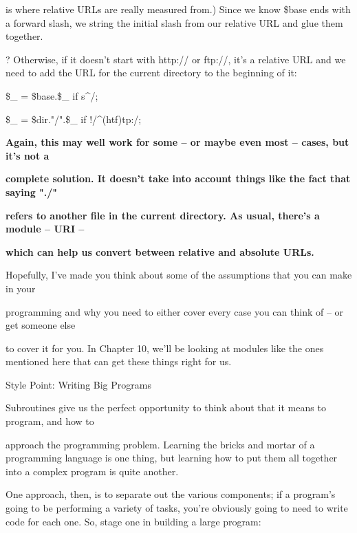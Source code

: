\documentclass[a4paper,11pt]{book}
\begin{document}
\noindent is where relative URLs are really measured from.) Since we know \$base ends with a forward slash, we string the initial slash from our relative URL and glue them together.

\noindent ? Otherwise, if it doesn't start with http:// or ftp://, it's a relative URL and we need to add the URL for the current directory to the beginning of it:

\noindent 

\noindent \$\_  = \$base.\$\_  if s\textbar \^{}/\textbar \textbar ;

\noindent \$\_  = \$dir."/".\$\_  if !/\^{}(ht\textbar f)tp:/;

\noindent 

\noindent 

\noindent \textbf{Again, this may well work for some -- or maybe even most -- cases, but it's not a}

\noindent \textbf{complete solution. It doesn't take into account things like the fact that saying "./"}

\noindent \textbf{refers to another file in the current directory. As usual, there's a module -- URI --}

\noindent \textbf{which can help us convert between relative and absolute URLs.}

\noindent 

\noindent 

\noindent Hopefully,  I've made you  think  about  some  of  the  assumptions  that  you  can  make  in  your

\noindent programming and why you  need  to  either  cover  every  case  you  can think  of  --  or  get someone  else

\noindent to  cover it for you.  In Chapter  10,  we'll  be  looking  at  modules  like  the ones  mentioned  here that can  get these things right for us.

\noindent 

\noindent 

\noindent Style Point: Writing Big Programs

\noindent Subroutines give us the perfect opportunity to think about that it means to program, and how to

\noindent approach the programming problem. Learning the bricks and mortar of a programming language is one thing, but learning how to put them all together into a complex program is quite another.

\noindent 

\noindent One approach, then, is to separate out the various components; if a program's going to be performing a variety of tasks, you're obviously going to need to write code for each one. So, stage one in building a large program:
\end{document}
